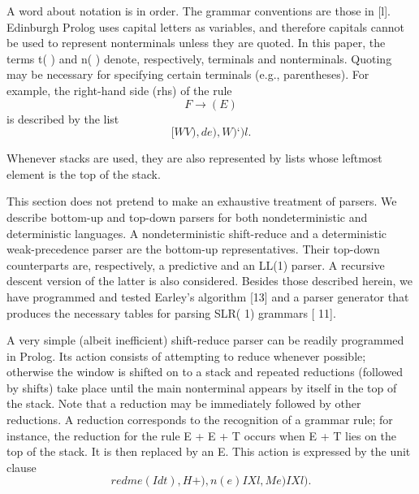 A word about notation is in order. The grammar conventions are those in [l].
Edinburgh Prolog uses capital letters as variables, and therefore capitals cannot
be used to represent nonterminals unless they are quoted. In this paper, the
terms t( ) and n( ) denote, respectively, terminals and nonterminals. Quoting
may be necessary for specifying certain terminals (e.g., parentheses). For example,
the right-hand side (rhs) of the rule
\[F \rightarrow (E)\]
is described by the list 
\[[WV), de), W)‘)l. \]

Whenever stacks are used, they are also represented by lists whose leftmost
element is the top of the stack. 

This section does not pretend to make an exhaustive treatment of parsers.
We describe bottom-up and top-down parsers for both nondeterministic and
deterministic languages. A nondeterministic shift-reduce and a deterministic
weak-precedence parser are the bottom-up representatives. Their top-down counterparts
are, respectively, a predictive and an LL(1) parser. A recursive descent
version of the latter is also considered. Besides those described herein, we have
programmed and tested Earley’s algorithm [13] and a parser generator that
produces the necessary tables for parsing SLR( 1) grammars [ 11]. 

\secdown


A very simple (albeit inefficient) shift-reduce parser can be readily programmed
in Prolog. Its action consists of attempting to reduce whenever possible; otherwise
the window is shifted on to a stack and repeated reductions (followed by shifts)
take place until the main nonterminal appears by itself in the top of the stack.
Note that a reduction may be immediately followed by other reductions. A
reduction corresponds to the recognition of a grammar rule; for instance, the
reduction for the rule E + E + T occurs when E + T lies on the top of the stack.
It is then replaced by an E. This action is expressed by the unit clause
\[redme(Idt), H+), n(e) I Xl, Me) I Xl). \]


